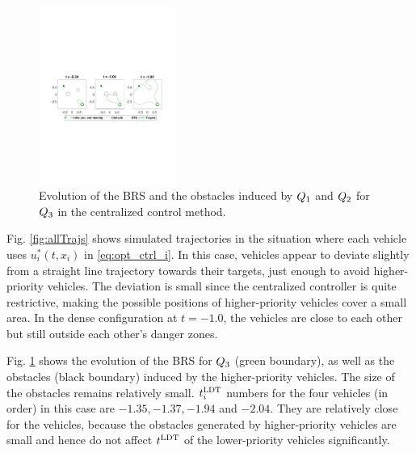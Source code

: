 \begin{figure}[H]
  \centering
  \includegraphics[width=0.4\textwidth]{"fig/cc_rs3"}
  \caption{Evolution of the BRS and the obstacles induced by $Q_1$ and $Q_2$ for $Q_3$ in the centralized control method.}
  \label{fig:cc_rs3}
\end{figure}
%
Fig. \ref{fig:allTrajs} shows simulated trajectories in the situation where each vehicle uses $u^*_i(t, x_i)$ in \eqref{eq:opt_ctrl_i}. In this case, vehicles appear to deviate slightly from a straight line trajectory towards their targets, just enough to avoid higher-priority vehicles. The deviation is small since the centralized controller is quite restrictive, making the possible positions of higher-priority vehicles cover a small area. In the dense configuration at $t=-1.0$, the vehicles are close to each other but still outside each other's danger zones.

Fig. \ref{fig:cc_rs3} shows the evolution of the BRS for $Q_3$ (green boundary), as well as the obstacles (black boundary) induced by the higher-priority vehicles. The size of the obstacles remains relatively small. $t^\text{LDT}_i$ numbers for the four vehicles (in order) in this case are $-1.35, -1.37, -1.94$ and $-2.04$. They are relatively close for the vehicles, because the obstacles generated by higher-priority vehicles are small and hence do not affect $t^\text{LDT}$ of the lower-priority vehicles significantly. 